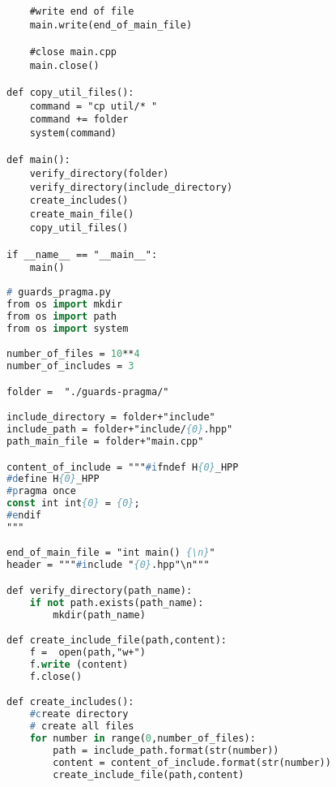 \begin{apendicesenv}
\begin{lstlisting}
    #write end of file
    main.write(end_of_main_file)

    #close main.cpp
    main.close()
                                                                                  
def copy_util_files():                                                           
    command = "cp util/* "                                                       
    command += folder                                                            
    system(command)      

def main():
    verify_directory(folder)
    verify_directory(include_directory)
    create_includes()
    create_main_file()
    copy_util_files()

if __name__ == "__main__":
    main()
\end{lstlisting}

\begin{lstlisting}[language=Pascal,frame=single,captionpos=b,
                                                caption={
                     Script usando para gerar diretorios com Guardas de Inclusão Interna
                                                               primeiro que pragma once},
                                                            label=script_guards_pragma_include]
# guards_pragma.py
from os import mkdir
from os import path
from os import system

number_of_files = 10**4
number_of_includes = 3

folder =  "./guards-pragma/"

include_directory = folder+"include"
include_path = folder+"include/{0}.hpp"
path_main_file = folder+"main.cpp"

content_of_include = """#ifndef H{0}_HPP
#define H{0}_HPP
#pragma once
const int int{0} = {0};
#endif
"""

end_of_main_file = "int main() {\n}"
header = """#include "{0}.hpp"\n"""

def verify_directory(path_name):
    if not path.exists(path_name):
        mkdir(path_name)

def create_include_file(path,content):
    f =  open(path,"w+")
    f.write (content)
    f.close()

def create_includes():
    #create directory
    # create all files
    for number in range(0,number_of_files):
        path = include_path.format(str(number))
        content = content_of_include.format(str(number))
        create_include_file(path,content)
    

\end{lstlisting}
\end{apendicesenv}
